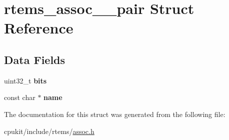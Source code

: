 \hypertarget{structrtems__assoc__32__pair}{}\section{rtems\+\_\+assoc\+\_\+\_\+pair Struct Reference}
\label{structrtems__assoc__32__pair}
\subsection*{Data Fields}
\begin{DoxyCompactItemize}
\item 
\mbox{\label{structrtems__assoc__32__pair_a5481ec3c6a54bf2061efdab3c1685d01}} 
uint32\+\_\+t {\bfseries bits}
\item 
\mbox{\label{structrtems__assoc__32__pair_ac4685da10b737a3d6356edca47531d79}} 
const char $\ast$ {\bfseries name}
\end{DoxyCompactItemize}


The documentation for this struct was generated from the following file\+:\begin{DoxyCompactItemize}
\item 
cpukit/include/rtems/\mbox{\hyperlink{assoc_8h}{assoc.\+h}}\end{DoxyCompactItemize}
